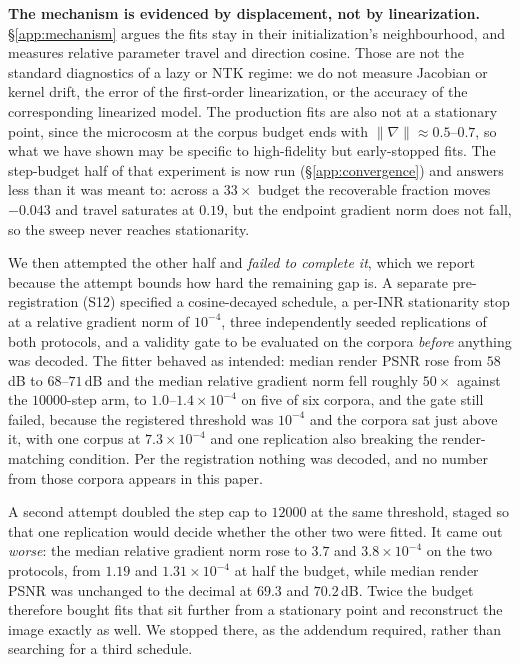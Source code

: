 \textbf{The mechanism is evidenced by displacement, not by linearization.} \S\ref{app:mechanism}
argues the fits stay in their initialization's neighbourhood, and measures relative parameter travel
and direction cosine. Those are not the standard diagnostics of a lazy or NTK regime: we do not
measure Jacobian or kernel drift, the error of the first-order linearization, or the accuracy of the
corresponding linearized model. The production fits are also not at a stationary point, since the microcosm at the corpus budget ends with $\|\nabla\|\approx0.5$--$0.7$, so what we have shown may
be specific to high-fidelity but early-stopped fits. The step-budget half of that experiment is now
run (\S\ref{app:convergence}) and answers less than it was meant to: across a $33\times$ budget the
recoverable fraction moves $-0.043$ and travel saturates at $0.19$, but the endpoint gradient norm
does not fall, so the sweep never reaches stationarity.

We then attempted the other half and \emph{failed to complete it}, which we report because the
attempt bounds how hard the remaining gap is. A separate pre-registration (S12) specified a
cosine-decayed schedule, a per-INR stationarity stop at a relative gradient norm of $10^{-4}$,
three independently seeded replications of both protocols, and a validity gate to be evaluated on
the corpora \emph{before} anything was decoded. The fitter behaved as intended: median render PSNR rose from $58$\,dB to $68$--$71$\,dB and the median relative gradient norm fell roughly
$50\times$ against the $10000$-step arm, to $1.0$--$1.4\times10^{-4}$ on five of six corpora, and the gate still failed, because the registered threshold was $10^{-4}$ and the corpora sat just
above it, with one corpus at $7.3\times10^{-4}$ and one replication also breaking the
render-matching condition. Per the registration nothing was decoded, and no number from those
corpora appears in this paper.

A second attempt doubled the step cap to $12000$ at the same threshold, staged so that one
replication would decide whether the other two were fitted. It came out \emph{worse}: the median
relative gradient norm rose to $3.7$ and $3.8\times10^{-4}$ on the two protocols, from $1.19$ and
$1.31\times10^{-4}$ at half the budget, while median render PSNR was unchanged to the decimal at
$69.3$ and $70.2$\,dB. Twice the budget therefore bought fits that sit further from a stationary
point and reconstruct the image exactly as well. We stopped there, as the addendum required, rather
than searching for a third schedule.

